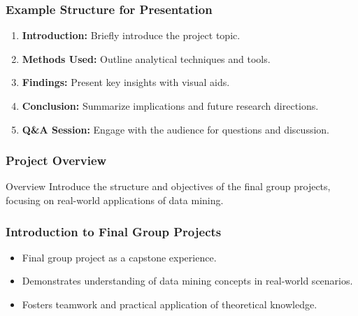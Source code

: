 \documentclass{beamer}
\begin{document}
\begin{frame}[fragile]
    \frametitle{Example Structure for Presentation}
    \begin{enumerate}
        \item \textbf{Introduction:} Briefly introduce the project topic.
        \item \textbf{Methods Used:} Outline analytical techniques and tools.
        \item \textbf{Findings:} Present key insights with visual aids.
        \item \textbf{Conclusion:} Summarize implications and future research directions.
        \item \textbf{Q\&A Session:} Engage with the audience for questions and discussion.
    \end{enumerate}
\end{frame}

\begin{frame}[fragile]
    \frametitle{Project Overview}
    \begin{block}{Overview}
        Introduce the structure and objectives of the final group projects, focusing on real-world applications of data mining.
    \end{block}
\end{frame}

\begin{frame}[fragile]
    \frametitle{Introduction to Final Group Projects}
    \begin{itemize}
        \item Final group project as a capstone experience.
        \item Demonstrates understanding of data mining concepts in real-world scenarios.
        \item Fosters teamwork and practical application of theoretical knowledge.
    \end{itemize}
\end{frame}
\end{document}
